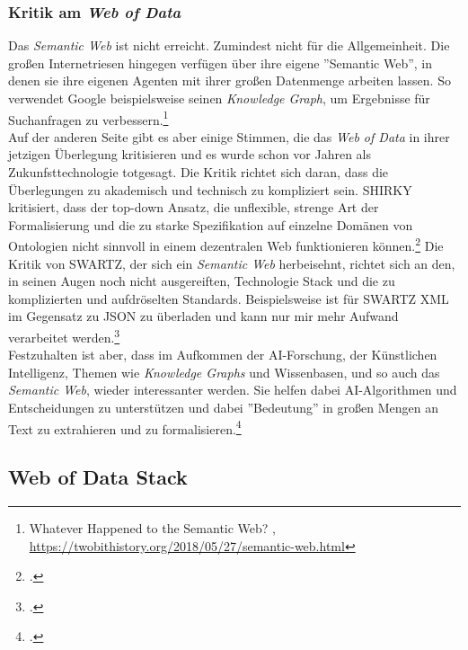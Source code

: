 \documentclass[12pt,a4paper]{article}
\begin{document}
\subsubsection{Kritik am \textit{Web of Data}}

Das \textit{Semantic Web} ist nicht erreicht. Zumindest nicht für die Allgemeinheit. Die großen Internetriesen hingegen verfügen über ihre eigene ''Semantic Web'', in denen sie ihre eigenen Agenten mit ihrer großen Datenmenge arbeiten lassen. So verwendet Google beispielsweise seinen \textit{Knowledge Graph}, um Ergebnisse für Suchanfragen zu verbessern.\footnote{Whatever Happened to the Semantic Web? , \url{https://twobithistory.org/2018/05/27/semantic-web.html}}
\\
Auf der anderen Seite gibt es aber einige Stimmen, die das \textit{Web of Data} in ihrer jetzigen Überlegung kritisieren und es wurde schon vor Jahren als Zukunfsttechnologie totgesagt. Die Kritik richtet sich daran, dass die Überlegungen zu akademisch und technisch zu kompliziert sein. SHIRKY kritisiert, dass der top-down Ansatz, die unflexible, strenge Art der Formalisierung und die zu starke Spezifikation auf einzelne Domänen von Ontologien nicht sinnvoll in einem dezentralen Web funktionieren können.\footcite{shirky2005ontology} Die Kritik von SWARTZ, der sich ein \textit{Semantic Web} herbeisehnt, richtet sich an den, in seinen Augen noch nicht ausgereiften, Technologie Stack und die zu komplizierten und aufdröselten Standards. Beispielsweise ist für SWARTZ XML im Gegensatz zu JSON zu überladen und kann nur mir mehr Aufwand verarbeitet werden.\footcite{swartz2013aaron}
\\
Festzuhalten ist aber, dass im Aufkommen der AI-Forschung, der Künstlichen Intelligenz, Themen wie \textit{Knowledge Graphs} und Wissenbasen, und so auch das \textit{Semantic Web}, wieder interessanter werden. Sie helfen dabei AI-Algorithmen und Entscheidungen zu unterstützen und dabei ''Bedeutung'' in großen Mengen an Text zu extrahieren und zu formalisieren.\footcite[][]{bernstein2016new}


\newpage
\subsection{Web of Data Stack}
\end{document}
